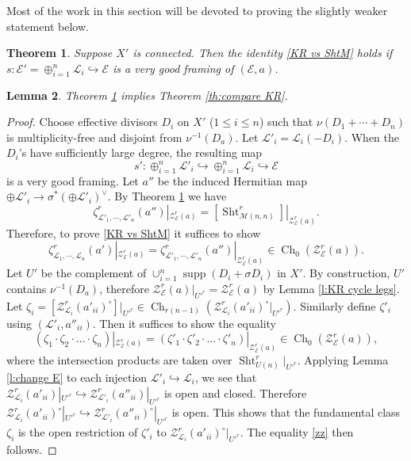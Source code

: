 \documentclass[reqno]{amsart}
\numberwithin{equation}{section}
\newcommand{\inj}{\hookrightarrow}
\DeclareMathOperator{\Sht}{Sht}
\DeclareMathOperator{\Ch}{Ch}
\DeclareMathOperator{\supp}{supp}
\newcommand\op{\oplus}
\newcommand{\s}{\sigma}
\newcommand{\z}{\zeta}
\newcommand\cE{\mathcal{E}}
\newcommand\cL{\mathcal{L}}
\newcommand\cM{\mathcal{M}}
\newcommand\cZ{\mathcal{Z}}
\newtheorem{thm}{Theorem}[section]
\newtheorem{lemma}[thm]{Lemma}
\theoremstyle{remark}
\numberwithin{equation}{section}
\begin{document}
Most of the work in this section will be devoted to proving the slightly weaker statement below. 
\begin{thm}\label{th:compare KR weak} Suppose $X'$ is connected. Then the identity \eqref{KR vs ShtM} holds if $s:\cE'=\op_{i=1}^{n}\cL_{i}\inj \cE$ is a very good framing of $(\cE,a)$.
\end{thm}


\begin{lemma}\label{l:weak implies strong} Theorem \ref{th:compare KR weak} implies Theorem \ref{th:compare KR}.
\end{lemma}
\begin{proof} Choose effective divisors $D_{i}$ on $X'$ ($1\le i\le n$) such that $\nu(D_{1}+\cdots+D_{n})$ is multiplicity-free and disjoint from $\nu^{-1}(D_{a})$. Let $\cL'_{i}=\cL_{i}(-D_{i})$. When the $D_{i}$'s have sufficiently large degree,  the resulting map
\begin{equation}
s': \op_{i=1}^{n}\cL'_{i}\inj \op_{i=1}^{n}\cL_{i}\inj \cE
\end{equation}
is a very good framing. Let $a''$ be the induced Hermitian map $\op\cL'_{i} \rightarrow \sigma^* (\op\cL'_{i})^{\vee}$. By Theorem \ref{th:compare KR weak} we have
\begin{equation}
\z^{r}_{\cL'_{1},\cdots, \cL'_{n}}(a'')|_{\cZ^{r}_{\cE}(a)}=[\Sht^{r}_{\cM(n,n)}]|_{\cZ^{r}_{\cE}(a)}.
\end{equation}
Therefore, to prove \eqref{KR vs ShtM} it suffices to show 
\begin{equation}
\z^{r}_{\cL_{1},\cdots, \cL_{n}}(a')|_{\cZ^{r}_{\cE}(a)}=\z^{r}_{\cL'_{1},\cdots, \cL'_{n}}(a'')|_{\cZ^{r}_{\cE}(a)}\in\Ch_{0}(\cZ^{r}_{\cE}(a)).
\end{equation}
Let $U'$ be the complement of $\cup_{i=1}^{n}\supp(D_{i}+\s D_{i})$ in $X'$. By construction, $U'$ contains $\nu^{-1}(D_{a})$, therefore $\cZ_{\cE}^{r}(a)|_{U'^{r}}=\cZ_{\cE}^{r}(a)$ by Lemma \ref{l:KR cycle legs}. Let $\z_{i}=[\cZ^{r}_{\cL_{i}}(a'_{ii})^{\circ}]|_{U'^{r}}\in \Ch_{r(n-1)}(\cZ^{r}_{\cL_{i}}(a'_{ii})^{\circ}|_{U'^{r}})$. Similarly define $\z'_{i}$ using $(\cL'_{i}, a''_{ii})$. Then it suffices to show the equality
\begin{equation}\label{zz}
(\z_{1}\cdot \z_{2}\cdot \dots \cdot\z_{n})|_{\cZ^{r}_{\cE}(a)}=(\z'_{1}\cdot \z'_{2}\cdot \dots \cdot\z'_{n})|_{\cZ^{r}_{\cE}(a)}\in \Ch_{0}(\cZ^{r}_{\cE}(a)),
\end{equation}
where the intersection products are taken over $\Sht^{r}_{U(n)}|_{U'^{r}}$. Applying Lemma \ref{l:change E}  to each injection $\cL'_{i}\inj \cL_{i}$, we see that $\cZ^{r}_{\cL_{i}}(a'_{ii})|_{U'^{r}}\inj \cZ^{r}_{\cL'_{i}}(a''_{ii})|_{U'^{r}}$ is open and closed. Therefore $\cZ^{r}_{\cL_{i}}(a'_{ii})^{\circ}|_{U'^{r}}\inj \cZ^{r}_{\cL'_{i}}(a''_{ii})^{\circ}|_{U'^{r}}$ is open. This shows that the fundamental class $\z_{i}$ is the open restriction of $\z'_{i}$ to $\cZ^{r}_{\cL_{i}}(a'_{ii})^{\circ}|_{U'^{r}}$. The equality \eqref{zz} then follows.
\end{proof}
\end{document}
